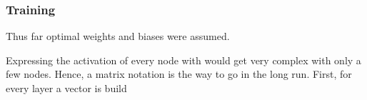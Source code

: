 \subsubsection{Training}
\label{sec:mlp-training}
Thus far optimal weights and biases were assumed.

Expressing the activation of every node with  would get very complex with only a few nodes.
Hence, a matrix notation is the way to go in the long run.
First, for every layer a vector is build